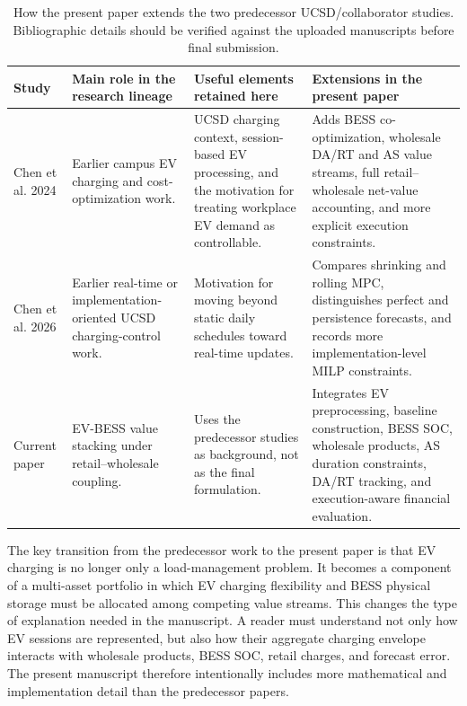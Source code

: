 \documentclass[final,5p,times]{elsarticle}
\begin{document}
\begin{table}[!t]
\centering
\caption{How the present paper extends the two predecessor UCSD/collaborator studies. Bibliographic details should be verified against the uploaded manuscripts before final submission.}
\label{tab:prior_work_positioning}
\scriptsize
\begin{tabularx}{\textwidth}{@{}p{}p{}p{}X@{}}
\toprule
Study & Main role in the research lineage & Useful elements retained here & Extensions in the present paper \\
\midrule
Chen et al. 2024 \cite{chen2024costoptimal} & Earlier campus EV charging and cost-optimization work. & UCSD charging context, session-based EV processing, and the motivation for treating workplace EV demand as controllable. & Adds BESS co-optimization, wholesale DA/RT and AS value streams, full retail--wholesale net-value accounting, and more explicit execution constraints.\\
Chen et al. 2026 \cite{chen2026realtime} & Earlier real-time or implementation-oriented UCSD charging-control work. & Motivation for moving beyond static daily schedules toward real-time updates. & Compares shrinking and rolling MPC, distinguishes perfect and persistence forecasts, and records more implementation-level MILP constraints.\\
Current paper & EV-BESS value stacking under retail--wholesale coupling. & Uses the predecessor studies as background, not as the final formulation. & Integrates EV preprocessing, baseline construction, BESS SOC, wholesale products, AS duration constraints, DA/RT tracking, and execution-aware financial evaluation.\\
\bottomrule
\end{tabularx}
\end{table}

The key transition from the predecessor work to the present paper is that EV charging is no longer only a load-management problem. It becomes a component of a multi-asset portfolio in which EV charging flexibility and BESS physical storage must be allocated among competing value streams. This changes the type of explanation needed in the manuscript. A reader must understand not only how EV sessions are represented, but also how their aggregate charging envelope interacts with wholesale products, BESS SOC, retail charges, and forecast error. The present manuscript therefore intentionally includes more mathematical and implementation detail than the predecessor papers.
\end{document}

